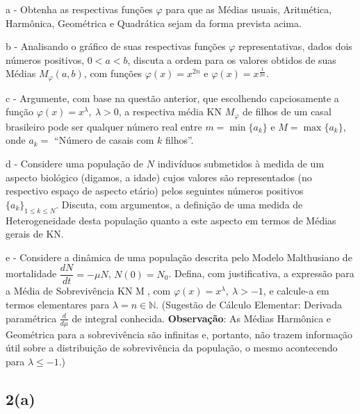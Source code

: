 \begin{description}
\item a - Obtenha as respectivas funções $\varphi$ para que as Médias usuais, Aritmética, Harmônica, Geométrica e Quadrática sejam da forma prevista
acima.

\item b - Analisando o gráfico de suas respectivas funções $\varphi$ representativas, dados dois números positivos, $0 < a < b$, discuta a ordem para os valores obtidos de suas Médias $M_\varphi(a, b)$, com funções $\varphi(x) = x^{2n}$ e $\varphi(x) = x^{\frac{1}{2n}}$.

\item c - Argumente, com base na questão anterior, que escolhendo capciosamente a função $\varphi(x) = x^{\lambda},\ \lambda > 0$, a respectiva média KN $M_\varphi$ de filhos de um casal brasileiro pode ser qualquer número real entre $m = \min\{a_k\}$ e $M = \max\{a_k\}$, onde $a_k = $ ``Número de casais com $k$ filhos''.

\item d - Considere uma população de $N$ indivíduos submetidos à medida de um aspecto biológico (digamos, a idade) cujos valores são representados (no respectivo espaço de aspecto etário) pelos seguintes números positivos $\{a_k\}_{1 \le k \le N}$. Discuta, com argumentos, a definição de uma medida de Heterogeneidade desta população quanto a este aspecto em termos de Médias gerais de KN.

\item e - Considere a dinâmica de uma população descrita pelo Modelo Malthusiano de mortalidade $\dfrac{dN}{dt} =-\mu N$, $N(0) = N_0$. Defina, com justificativa, a expressão para a Média de Sobrevivência KN M, com $\varphi(x) = x^\lambda,\ \lambda > -1$, e calcule-a em termos elementares para \(\lambda = n \in \mathbb{N}\). {\tiny (Sugestão de Cálculo Elementar: Derivada paramétrica \(\frac{d}{d\mu}\) de integral conhecida. \textbf{Observação}: As Médias Harmônica e Geométrica para a sobrevivência são infinitas e, portanto, não trazem informação útil sobre a distribuição de sobrevivência da população, o mesmo acontecendo para \(\lambda \le -1\).)}
\end{description}


\subsection*{2(a)}


